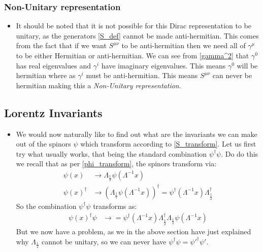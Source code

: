 \documentclass[11pt]{article}
\numberwithin{equation}{section}
\begin{document}
\subsubsection{Non-Unitary representation}
\begin{itemize}
  \item It should be noted that it is not possible for this Dirac representation to be unitary, as the generators \ref{S_def} cannot be made anti-hermitian. This comes from the fact that if we want $S^{\mu\nu}$ to be anti-hermitian then we need all of $\gamma^{\mu}$ to be either Hermitian or anti-hermitian. We can see from \ref{gamma^2} that $\gamma^{0}$ has real eigenvalues and $\gamma^{i}$ have imaginary eigenvalues. This means $\gamma^{0}$ will be hermitian where as $\gamma^{i}$ must be anti-hermitian. This means $S^{\mu\nu}$ can never be hermitian making this a \emph{Non-Unitary representation}.  
\end{itemize}
\subsection{Lorentz Invariants}
\begin{itemize}
  \item We would now naturally like to find out what are the invariants we can make out of the spinors $\psi$ which transform according to \ref{S_transform}. Let us first try what usually works, that being the standard combination $\psi^{\dagger}\psi$. Do do this we recall that as per \ref{phi_transform}, the spinors transform via: 
  \begin{align*}
      \psi(x) &\rightarrow \Lambda_{\frac{1}{2}}\psi(\Lambda^{-1}x) \\
      \psi(x)^{\dagger} &\rightarrow \left(\Lambda_{\frac{1}{2}}\psi(\Lambda^{-1}x)\right)^{\dagger} = \psi^{\dagger}(\Lambda^{-1}x)\Lambda^{\dagger}_{\frac{1}{2}}
    \end{align*}  
    So the combination $\psi^{\dagger}\psi$ transforms as:
    \begin{align*}
      \psi(x)^{\dagger}\psi &\rightarrow = \psi^{\dagger}(\Lambda^{-1}x)\Lambda^{\dagger}_{\frac{1}{2}}\Lambda_{\frac{1}{2}}\psi(\Lambda^{-1}x)
    \end{align*}
    But we now have a problem, as we in the above section have just explained why $\Lambda_{\frac{1}{2}}$ cannot be unitary, so we can never have $\psi^{\dagger}\psi = \psi'^{\dagger}\psi'$. 
  \end{itemize}
\end{document}

